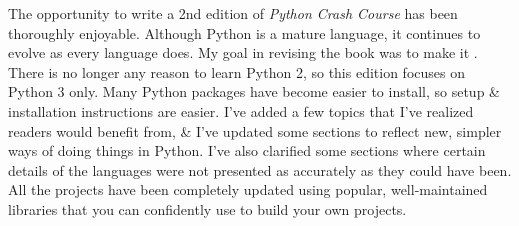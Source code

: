 \documentclass[oneside]{book}
\numberwithin{equation}{section}
\begin{document}
The opportunity to write a 2nd edition of \textit{Python Crash Course} has been thoroughly enjoyable. Although Python is a mature language, it continues to evolve as every language does. My goal in revising the book was to make it . There is no longer any reason to learn Python 2, so this edition focuses on Python 3 only. Many Python packages have become easier to install, so setup \& installation instructions are easier. I've added a few topics that I've realized readers would benefit from, \& I've updated some sections to reflect new, simpler ways of doing things in Python. I've also clarified some sections where certain details of the languages were not presented as accurately as they could have been. All the projects have been completely updated using popular, well-maintained libraries that you can confidently use to build your own projects.
\end{document}
